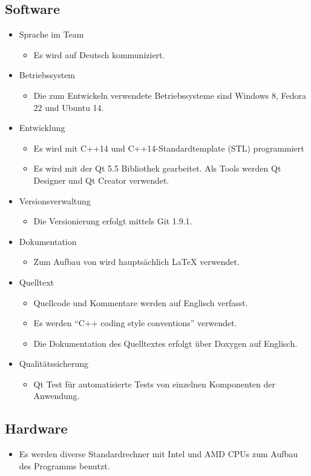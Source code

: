 \subsection{Software}
\begin{itemize}
\item Sprache im Team
	\begin{itemize}[label={--}]
		\item Es wird auf Deutsch kommuniziert.
	\end{itemize}
\item Betriebssystem
	\begin{itemize}[label={--}]
		\item Die zum Entwickeln verwendete Betriebssysteme sind Windows 8, Fedora 22 und Ubuntu 14.
	\end{itemize}
\item Entwicklung
	\begin{itemize}[label={--}]
		\item Es wird mit C++14 und C++14-Standardtemplate (STL) programmiert
		\item Es wird mit der \gls{Qt} 5.5 Bibliothek gearbeitet. Als Tools werden \gls{Qt Designer} und \gls{Qt Creator} verwendet.
	\end{itemize}
\item \gls{Versionsverwaltung}
	\begin{itemize}[label={--}]
		\item Die Versionierung erfolgt mittels \gls{Git} 1.9.1.
	\end{itemize}
\item Dokumentation
	\begin{itemize}[label={--}]
		\item Zum Aufbau von  wird hauptsächlich LaTeX verwendet.
	\end{itemize}
\item Quelltext
	\begin{itemize}[label={--}]
		\item Quellcode und Kommentare werden auf Englisch verfasst.
		\item Es werden \enquote{C++ coding style conventions} verwendet.
		\item Die Dokumentation des Quelltextes erfolgt über \gls{Doxygen} auf Englisch.
	\end{itemize}
\item Qualitätssicherung
	\begin{itemize}[label={--}]
		\item \gls{Qt Test} für automatisierte Tests von einzelnen Komponenten der Anwendung.
	\end{itemize}

\end{itemize}

\subsection{Hardware}
\begin{itemize}
	\item Es werden diverse Standardrechner mit Intel und AMD CPUs zum Aufbau des Programms benutzt.
\end{itemize}
\pagebreak
